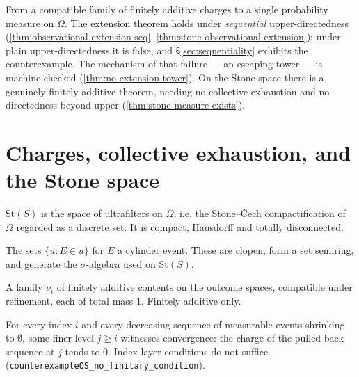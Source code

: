 From a compatible family of finitely additive charges to a single probability
measure on $\Omega$. The extension theorem holds under \emph{sequential}
upper-directedness (\ref{thm:observational-extension-seq},
\ref{thm:stone-observational-extension}); under plain upper-directedness it is
false, and \S\ref{sec:sequentiality} exhibits the counterexample. The
mechanism of that failure --- an escaping tower --- is machine-checked
(\ref{thm:no-extension-tower}). On the Stone space there is a genuinely
finitely additive theorem, needing no collective exhaustion and no
directedness beyond upper (\ref{thm:stone-measure-exists}).

\section{Charges, collective exhaustion, and the Stone space}

\begin{definition}
\label{def:stone-space}
\leanok
$\mathrm{St}(S)$ is the space of ultrafilters on $\Omega$, i.e. the
Stone--\v{C}ech compactification of $\Omega$ regarded as a discrete set. It is
compact, Hausdorff and totally disconnected.
\end{definition}

\begin{definition}
\label{def:stone-clopens}
\leanok
{}
The sets $\{u : E \in u\}$ for $E$ a cylinder event. These are clopen, form a
set semiring, and generate the $\sigma$-algebra used on $\mathrm{St}(S)$.
\end{definition}

\begin{definition}
\label{def:ncc}
\leanok
A family $\nu_i$ of finitely additive contents on the outcome spaces,
compatible under refinement, each of total mass $1$. Finitely additive only.
\end{definition}

\begin{definition}
\label{def:collectively-exhaustive}
\leanok
For every index $i$ and every decreasing sequence of measurable events
shrinking to $\emptyset$, some finer level $j \geq i$ witnesses convergence:
the charge of the pulled-back sequence at $j$ tends to $0$. Index-layer
conditions do not suffice
(\texttt{counterexampleQS\_no\_finitary\_condition}).
\end{definition}

